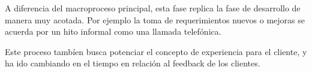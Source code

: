 A diferencia del macroproceso principal, esta fase replica la fase de desarrollo de manera muy acotada. Por ejemplo la toma de
requerimientos nuevos o mejoras se acuerda por un hito informal como una llamada telefónica.

Este proceso tambíen busca potenciar el concepto de experiencia para el cliente, y ha ido cambiando en el tiempo en relación
al feedback de los clientes.












